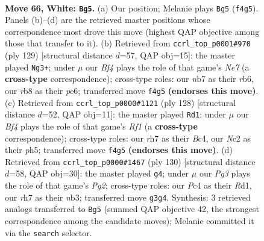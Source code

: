 \documentclass[11pt]{article}
\begin{document}
\clearpage

\begin{figure}[p]\centering
\begin{subfigure}{0.46\textwidth}\centering
\resizebox{\linewidth}{!}{%
\newchessgame
\chessboard[
  setfen={1r6/pn4kr/1p2p3/4P2p/2P2B2/2K3PR/P1N2R2/8 w - - 3 66},
  showmover=false,
  pgfstyle=straightmove, color=movearrow, markmove={f4-g5}
]}
\caption{}
\end{subfigure}\hfill
\begin{subfigure}{0.46\textwidth}\centering
\resizebox{\linewidth}{!}{%
\newchessgame
\chessboard[
  setfen={6k1/3r2p1/1R1PPp2/p7/P6p/7P/2r1n3/3R1K2 b - - 4 65},
  showmover=false,
  pgfstyle=straightmove, color=movearrow, markmove={e2-g3}
]}
\caption{}
\end{subfigure}
\\[4pt]
\begin{subfigure}{0.46\textwidth}\centering
\resizebox{\linewidth}{!}{%
\newchessgame
\chessboard[
  setfen={8/n2r1p1k/1p1P2p1/7p/P1B2P2/1P6/7P/5R1K w - - 1 65},
  showmover=false,
  pgfstyle=straightmove, color=movearrow, markmove={f1-d1}
]}
\caption{}
\end{subfigure}\hfill
\begin{subfigure}{0.46\textwidth}\centering
\resizebox{\linewidth}{!}{%
\newchessgame
\chessboard[
  setfen={r4r2/8/4k1p1/p2p4/2p2P2/1nP1B2P/R5PK/3R4 w - - 3 66},
  showmover=false,
  pgfstyle=straightmove, color=movearrow, markmove={g2-g4}
]}
\caption{}
\end{subfigure}
\caption{\textbf{Move 66, White: \texttt{Bg5}.} (a) Our position; Melanie plays \texttt{Bg5} (\texttt{f4g5}). Panels (b)--(d) are the retrieved master positions whose correspondence most drove this move (highest QAP objective among those that transfer to it). (b) Retrieved from \texttt{ccrl\_top\_p0001\#970} (ply 129) [structural distance $d$=57, QAP obj=15]: the master played \texttt{Ng3+}; under $\mu$ our \emph{Bf4} plays the role of that game's \emph{Ne7} (a \textbf{cross-type} correspondence); cross-type roles: our \emph{n}b7 as their \emph{r}b6, our \emph{r}b8 as their \emph{p}e6; transferred move \texttt{f4g5} \textbf{(endorses this move)}. (c) Retrieved from \texttt{ccrl\_top\_p0000\#1121} (ply 128) [structural distance $d$=52, QAP obj=11]: the master played \texttt{Rd1}; under $\mu$ our \emph{Bf4} plays the role of that game's \emph{Rf1} (a \textbf{cross-type} correspondence); cross-type roles: our \emph{r}h7 as their \emph{B}c4, our \emph{N}c2 as their \emph{p}h5; transferred move \texttt{f4g5} \textbf{(endorses this move)}. (d) Retrieved from \texttt{ccrl\_top\_p0000\#1467} (ply 130) [structural distance $d$=58, QAP obj=30]: the master played \texttt{g4}; under $\mu$ our \emph{Pg3} plays the role of that game's \emph{Pg2}; cross-type roles: our \emph{P}c4 as their \emph{R}d1, our \emph{r}h7 as their \emph{n}b3; transferred move \texttt{g3g4}. Synthesis: 3 retrieved analogs transferred to \texttt{Bg5} (summed QAP objective 42, the strongest correspondence among the candidate moves); Melanie committed it via the \texttt{search} selector.}
\label{fig:thought-m130}
\end{figure}
\end{document}
